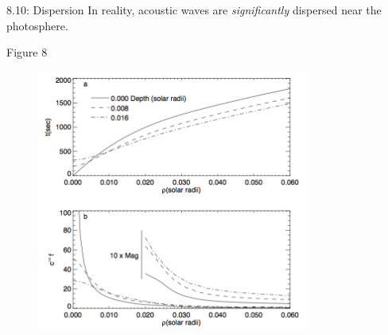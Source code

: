 \documentclass{beamer}
\begin{document}
\begin{frame}{8.6}
\end{frame}

\begin{frame}{8.7}
\end{frame}

\begin{frame}{8.8}
\end{frame}

\begin{frame}{8.9}
\end{frame}

\begin{frame}{8.10: Dispersion}
    In reality, acoustic waves are \emph{significantly} dispersed
    near the photosphere.
\end{frame}

\begin{frame}{8.11}
\end{frame}

\begin{frame}{8.12}
\end{frame}

\begin{frame}{8.13}
\end{frame}

\begin{frame}{8.14}
\end{frame}

\begin{frame}{Figure 8}
    \begin{figure}
        \includegraphics[width=0.8\textwidth]{fig_8.png}
    \end{figure}
\end{frame}
\end{document}
